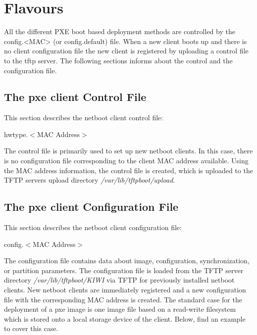 \section{Flavours}

All the different PXE boot based deployment methods are controlled
by the config.<MAC> (or config.default) file. When a new client
boots up and there is no client configuration file the new client
is registered by uploading a control file to the tftp server.
The following sections informs about the control and the configuration
file.

\subsection{The pxe client Control File}
\label{section:cntrlhw}
This section describes the netboot client control file:

\begin{Command}{8cm}
hwtype.$<$MAC Address$>$
\end{Command}

The control file is primarily used to set up new netboot clients. In this
case, there is no configuration file corresponding to the client
MAC address available. Using the MAC address information, the control file
is created, which is uploaded to the TFTP servers upload directory
\textit{/var/lib/tftpboot/upload}.

\subsection{The pxe client Configuration File}
\label{section:confmac}
This section describes the netboot client configuration file:

\begin{Command}{8cm}
    config.$<$MAC Address$>$
\end{Command}

The configuration file contains data about image, configuration,
synchronization, or partition parameters. The configuration file is
loaded from the TFTP server directory \textit{/var/lib/tftpboot/KIWI} via TFTP
for previously installed netboot clients. New netboot clients are
immediately registered and a new configuration file with the
corresponding MAC address is created. The standard case for the
deployment of a pxe image is one image file based on a read-write
filesystem which is stored onto a local storage device of the client.
Below, find an example to cover this case.

